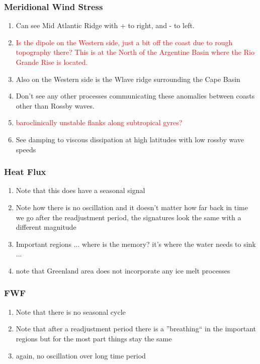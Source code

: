 \documentclass[a4paper,11pt]{article}
\newcommand{\red}[1]{\textcolor{red}{#1}}
\begin{document}
   \subsubsection{Meridional Wind Stress}
    \begin{enumerate}
	\item Can see Mid Atlantic Ridge with + to right, and - to left. 
	\item \red{Is the dipole on the Western side, just a bit off the coast due to rough topography there? This is at the North of the Argentine Basin where the Rio Grande Rise is located.}
	\item Also on the Western side is the Wlave ridge surrounding the Cape Basin
	\item Don't see any other processes communicating these anomalies between coasts other than Rossby waves. 
	\item \red{baroclinically unstable flanks along subtropical gyres?}
	\item See damping to viscous dissipation at high latitudes with low rossby wave speeds
    \end{enumerate} 
   \subsubsection{Heat Flux} 
    \begin{enumerate} 
	\item Note that this does have a seasonal signal 
	\item Note how there is no oscillation and it doesn't matter how far back in time we go after the readjustment period, the signatures look the same with a different magnitude
	\item Important regions ... where is the memory? it's where the water needs to sink ... 
	\item note that Greenland area does not incorporate any ice melt processes 
    \end{enumerate} 
   \subsubsection{FWF}
    \begin{enumerate}
	\item Note that there is no seasonal cycle
	\item Note that after a readjustment period there is a ''breathing`` in the important regions but for the most part things stay the same 
	\item again, no oscillation over long time period
    \end{enumerate} 
\end{document}
